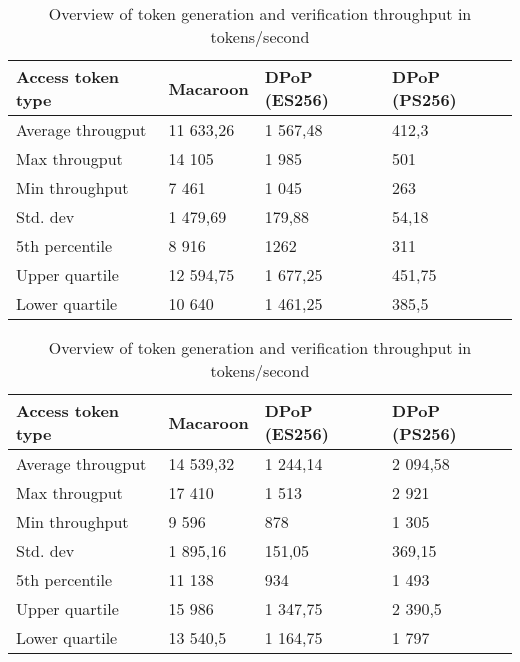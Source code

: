 \begin{table}[H]
\begin{subtable}{1.0\textwidth}
\centering
\begin{tabular}{llll}
\textbf{Access token type} & \textbf{Macaroon} & \textbf{DPoP (ES256)} & \textbf{DPoP (PS256)} \\ \hline
Average througput          & 11 633,26          & 1 567,48               & 412,3                 \\
Max througput              & 14 105             & 1 985                  & 501                   \\
Min throughput             & 7 461              & 1 045                  & 263                   \\
Std. dev                   & 1 479,69           & 179,88                & 54,18                 \\
5th percentile            & 8 916         & 1262            & 311                 \\
Upper quartile             & 12 594,75          & 1 677,25               & 451,75                \\
Lower quartile             & 10 640             & 1 461,25               & 385,5                
\end{tabular}
\caption{Token generation throughput}
\label{table:token-gen-throughput}
\end{subtable}

\vspace*{0.5 cm}

\begin{subtable}{1.0\textwidth}
\centering
\begin{tabular}{llll}
\textbf{Access token type} & \textbf{Macaroon} & \textbf{DPoP (ES256)} & \textbf{DPoP (PS256)} \\ \hline
Average througput          & 14 539,32          & 1 244,14               & 2 094,58               \\
Max througput              & 17 410             & 1 513                  & 2 921                  \\
Min throughput             & 9 596              & 878                   & 1 305                  \\
Std. dev                   & 1 895,16           & 151,05                & 369,15                \\
5th percentile            & 11 138          & 934                  & 1 493                \\
Upper quartile             & 15 986             & 1 347,75               & 2 390,5                \\
Lower quartile             & 13 540,5           & 1 164,75               & 1 797                 
\end{tabular}
\caption{Token verification throughput}
\label{table:token-ver-throughput}
\end{subtable}

\caption{Overview of token generation and verification throughput in tokens/second}
\label{table:token-througput}

\end{table}